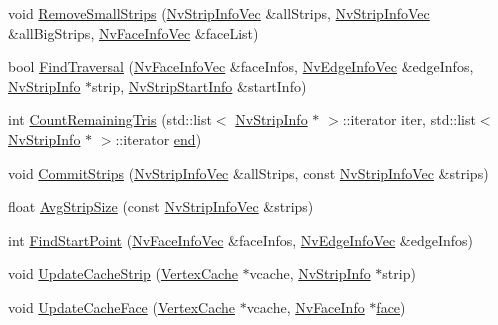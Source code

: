 \begin{CompactItemize}
\item 
void \hyperlink{class_nv_stripifier_12373863311286b3dfc078018acdbc5c}{RemoveSmallStrips} (\hyperlink{_nv_tri_strip_objects_8h_83f9ba7bd0288dc93c5eed20e7f61170}{NvStripInfoVec} \&allStrips, \hyperlink{_nv_tri_strip_objects_8h_83f9ba7bd0288dc93c5eed20e7f61170}{NvStripInfoVec} \&allBigStrips, \hyperlink{_nv_tri_strip_objects_8h_93d0a2f26991e801145908bc4d3d9156}{NvFaceInfoVec} \&faceList)
\item 
bool \hyperlink{class_nv_stripifier_6102543c9d36dc8eccf056ce63303e90}{FindTraversal} (\hyperlink{_nv_tri_strip_objects_8h_93d0a2f26991e801145908bc4d3d9156}{NvFaceInfoVec} \&faceInfos, \hyperlink{_nv_tri_strip_objects_8h_58592f6a13118931e843d05574249663}{NvEdgeInfoVec} \&edgeInfos, \hyperlink{class_nv_strip_info}{NvStripInfo} $\ast$strip, \hyperlink{class_nv_strip_start_info}{NvStripStartInfo} \&startInfo)
\item 
int \hyperlink{class_nv_stripifier_4bafe0ae9aa21f466b0e1faf7194861c}{CountRemainingTris} (std::list$<$ \hyperlink{class_nv_strip_info}{NvStripInfo} $\ast$ $>$::iterator iter, std::list$<$ \hyperlink{class_nv_strip_info}{NvStripInfo} $\ast$ $>$::iterator \hyperlink{glext__bak_8h_432111147038972f06e049e18a837002}{end})
\item 
void \hyperlink{class_nv_stripifier_a94ce7ff064c7fd29890f90d2fb0d9cc}{CommitStrips} (\hyperlink{_nv_tri_strip_objects_8h_83f9ba7bd0288dc93c5eed20e7f61170}{NvStripInfoVec} \&allStrips, const \hyperlink{_nv_tri_strip_objects_8h_83f9ba7bd0288dc93c5eed20e7f61170}{NvStripInfoVec} \&strips)
\item 
float \hyperlink{class_nv_stripifier_7abe9874deba1964f2c019a1fc6ad0da}{AvgStripSize} (const \hyperlink{_nv_tri_strip_objects_8h_83f9ba7bd0288dc93c5eed20e7f61170}{NvStripInfoVec} \&strips)
\item 
int \hyperlink{class_nv_stripifier_07e511a48d634c1630aece77953331d5}{FindStartPoint} (\hyperlink{_nv_tri_strip_objects_8h_93d0a2f26991e801145908bc4d3d9156}{NvFaceInfoVec} \&faceInfos, \hyperlink{_nv_tri_strip_objects_8h_58592f6a13118931e843d05574249663}{NvEdgeInfoVec} \&edgeInfos)
\item 
void \hyperlink{class_nv_stripifier_7f4b921943317075f76558c4665c7d58}{UpdateCacheStrip} (\hyperlink{class_vertex_cache}{VertexCache} $\ast$vcache, \hyperlink{class_nv_strip_info}{NvStripInfo} $\ast$strip)
\item 
void \hyperlink{class_nv_stripifier_bba4a460c63fc132708ccd05474caff0}{UpdateCacheFace} (\hyperlink{class_vertex_cache}{VertexCache} $\ast$vcache, \hyperlink{class_nv_face_info}{NvFaceInfo} $\ast$\hyperlink{glext_8h_676ca580c460c0154eb58200433d2a9e}{face})

\end{CompactItemize}
